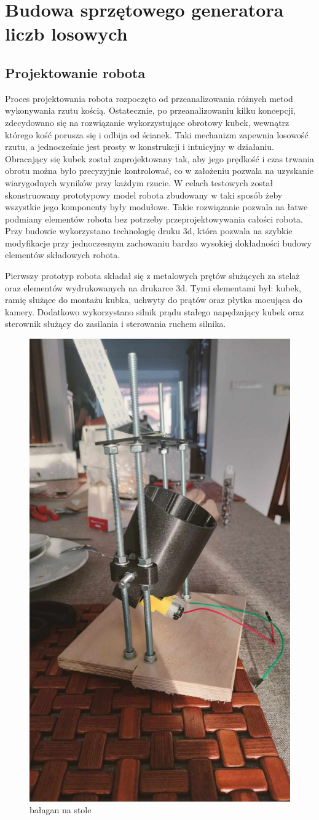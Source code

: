
\chapter{Budowa sprzętowego generatora liczb losowych}
\section{Projektowanie robota}

Proces projektowania robota rozpoczęto od przeanalizowania różnych metod wykonywania rzutu kością.
Ostatecznie, po przeanalizowaniu kilku koncepcji, zdecydowano się na rozwiązanie wykorzystujące obrotowy 
kubek, wewnątrz którego kość porusza się i odbija od ścianek. Taki mechanizm zapewnia losowość rzutu, a 
jednocześnie jest prosty w konstrukcji i intuicyjny w działaniu. Obracający się kubek został 
zaprojektowany tak, aby jego prędkość i czas trwania obrotu można było precyzyjnie kontrolować, co  w założeniu 
pozwala na uzyskanie wiarygodnych wyników przy każdym rzucie. W celach testowych został skonstruowany prototypowy
model robota zbudowany w taki sposób żeby wszystkie jego komponenty były modułowe. Takie rozwiązanie pozwala na 
łatwe podmiany elementów robota bez potrzeby przeprojektowywania całości robota. Przy budowie wykorzystano 
technologię druku 3d, która pozwala na szybkie modyfikacje przy jednoczesnym zachowaniu bardzo wysokiej dokładności
budowy elementów składowych robota.

Pierwszy prototyp robota składał się z metalowych prętów służących za stelaż oraz elementów wydrukowanych na drukarce 3d.
Tymi elementami był: kubek, ramię służące do montażu kubka, uchwyty do prątów oraz płytka mocująca do kamery. Dodatkowo
wykorzystano silnik prądu stałego napędzający kubek oraz sterownik służący do zasilania i sterowania ruchem silnika.

\begin{figure}
    \centering
    \includegraphics[width=0.25\linewidth]{chapters/03-praca-wlasna/figures/pierwszy}
    \caption{\label{fig:pierwszy}bałagan na stole}
\end{figure}
    

